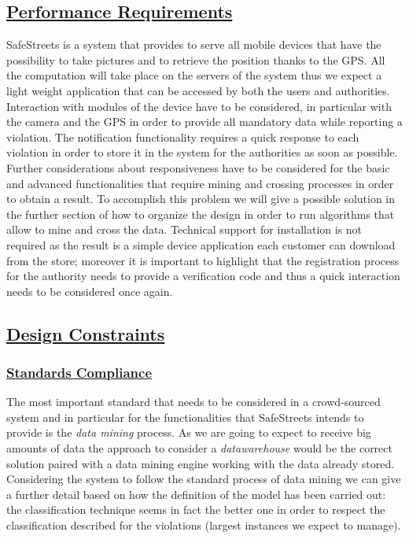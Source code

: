 	\subsection[Performance Requirements]{\hyperlink{toc}{Performance Requirements}}
		SafeStreets is a system that provides to serve all mobile devices that have the possibility to take pictures and to retrieve the position thanks to the GPS. All the computation will take place on the servers of the system thus we expect a light weight application that can be accessed by both the users and authorities. Interaction with modules of the device have to be considered, in particular with the camera and the GPS in order to provide all mandatory data while reporting a violation. The notification functionality requires a quick response to each violation in order to store it in the system for the authorities as soon as possible. Further considerations about responsiveness have to be considered for the basic and advanced functionalities that require mining and crossing processes in order to obtain a result. To accomplish this problem we will give a possible solution in the further section of how to organize the design in order to run algorithms that allow to mine and cross the data. Technical support for installation is not required as the result is a simple device application each customer can download from the store; moreover it is important to highlight that the registration process for the authority needs to provide a verification code and thus a quick interaction needs to be considered once again.
	
	\subsection[Design Constraints]{\hyperlink{toc}{Design Constraints}}
		\subsubsection[Standards Compliance]{\hyperlink{toc}{Standards Compliance}}
			\label{sec:standardCompliance}
			The most important standard that needs to be considered in a crowd-sourced system and in particular for the functionalities that SafeStreets intends to provide is the \emph{data mining} process. As we are going to expect to receive big amounts of data the approach to consider a \emph{datawarehouse} would be the correct solution paired with a data mining engine working with the data already stored. Considering the system to follow the standard process of data mining we can give a further detail based on how the definition of the model has been carried out: the classification technique seems in fact the better one in order to respect the classification described for the violations (largest instances we expect to manage). 
